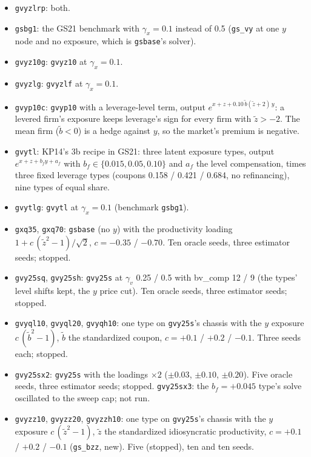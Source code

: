 \documentclass[11pt]{article}
\begin{document}
\begin{itemize}
\item \texttt{gvyzlrp}: both.
\item \texttt{gsbg1}: the GS21 benchmark with $\gamma_x=0.1$ instead of 0.5 (\texttt{gs\_vy} at one $y$ node and no exposure, which is \texttt{gsbase}'s solver).
\item \texttt{gvyz10g}: \texttt{gvyz10} at $\gamma_x=0.1$.
\item \texttt{gvyzlg}: \texttt{gvyzlf} at $\gamma_x=0.1$.
\item \texttt{gvyp10c}: \texttt{gvyp10} with a leverage-level term, output $e^{x+z+0.10\,\tilde b(\tilde z+2)\,y}$: a levered firm's exposure keeps leverage's sign for every firm with $\tilde z>-2$. The mean firm ($\tilde b<0$) is a hedge against $y$, so the market's premium is negative.
\item \texttt{gvytl}: KP14's 3b recipe in GS21: three latent exposure types, output $e^{x+z+b_f y+a_f}$ with $b_f\in\{0.015,0.05,0.10\}$ and $a_f$ the level compensation, times three fixed leverage types (coupons 0.158 / 0.421 / 0.684, no refinancing), nine types of equal share.
\item \texttt{gvytlg}: \texttt{gvytl} at $\gamma_x=0.1$ (benchmark \texttt{gsbg1}).
\item \texttt{gxq35}, \texttt{gxq70}: \texttt{gsbase} (no $y$) with the productivity loading $1 + c\,(\tilde z^2-1)/\sqrt2$, $c=-0.35$ / $-0.70$. Ten oracle seeds, three estimator seeds; stopped.
\item \texttt{gvy25sq}, \texttt{gvy25sh}: \texttt{gvy25s} at $\gamma_v$ 0.25 / 0.5 with bv\_comp 12 / 9 (the types' level shifts kept, the $y$ price cut). Ten oracle seeds, three estimator seeds; stopped.
\item \texttt{gvyql10}, \texttt{gvyql20}, \texttt{gvyqh10}: one type on \texttt{gvy25s}'s chassis with the $y$ exposure $c\,(\tilde b^2-1)$, $\tilde b$ the standardized coupon, $c=+0.1$ / $+0.2$ / $-0.1$. Three seeds each; stopped.
\item \texttt{gvy25sx2}: \texttt{gvy25s} with the loadings $\times2$ ($\pm0.03$, $\pm0.10$, $\pm0.20$). Five oracle seeds, three estimator seeds; stopped. \texttt{gvy25sx3}: the $b_f=+0.045$ type's solve oscillated to the sweep cap; not run.
\item \texttt{gvyzz10}, \texttt{gvyzz20}, \texttt{gvyzzh10}: one type on \texttt{gvy25s}'s chassis with the $y$ exposure $c\,(\tilde z^2-1)$, $\tilde z$ the standardized idiosyncratic productivity, $c=+0.1$ / $+0.2$ / $-0.1$ (\texttt{gs\_bzz}, new). Five (stopped), ten and ten seeds.

\end{itemize}
\end{document}

